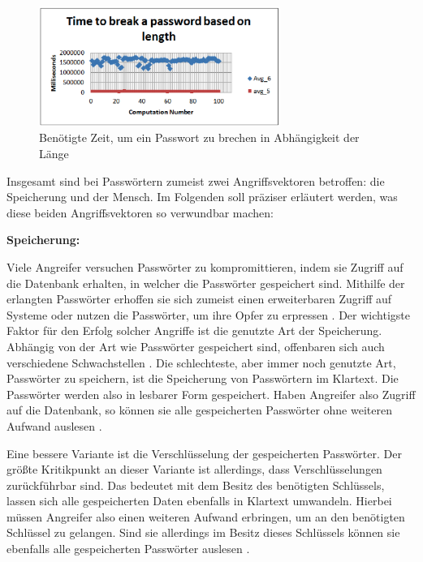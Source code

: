     \begin{figure}[H]
        \centering 
        \includegraphics[width=0.7\textwidth]{img/abbildungen/length-time.png}
        \captionsetup{format=hang}
        \caption{Benötigte Zeit, um ein Passwort zu brechen in Abhängigkeit der Länge \cite{chanda2016password}} \label{timetobreak}
    \end{figure}

    Insgesamt sind bei Passwörtern zumeist zwei Angriffsvektoren betroffen: die Speicherung und der Mensch. Im Folgenden soll präziser erläutert werden, was diese beiden Angriffsvektoren so verwundbar machen:

    \textbf{Speicherung:}

    Viele Angreifer versuchen Passwörter zu kompromittieren, indem sie Zugriff auf die Datenbank erhalten, in welcher die Passwörter gespeichert sind. Mithilfe der erlangten Passwörter erhoffen sie sich zumeist einen erweiterbaren Zugriff auf Systeme oder nutzen die Passwörter, um ihre Opfer zu erpressen \cite{boonkrong2012security}. Der wichtigste Faktor für den Erfolg solcher Angriffe ist die genutzte Art der Speicherung. Abhängig von der Art wie Passwörter gespeichert sind, offenbaren sich auch verschiedene Schwachstellen \cite{chanda2016password}.
    Die schlechteste, aber immer noch genutzte Art, Passwörter zu speichern, ist die Speicherung von Passwörtern im Klartext. Die Passwörter werden also in lesbarer Form gespeichert. Haben Angreifer also Zugriff auf die Datenbank, so können sie alle gespeicherten Passwörter ohne weiteren Aufwand auslesen \cite{chanda2016password}.

    Eine bessere Variante ist die Verschlüsselung der gespeicherten Passwörter. Der größte Kritikpunkt an dieser Variante ist allerdings, dass Verschlüsselungen zurückführbar sind. Das bedeutet mit dem Besitz des benötigten Schlüssels, lassen sich alle gespeicherten Daten ebenfalls in Klartext umwandeln. Hierbei müssen Angreifer also einen weiteren Aufwand erbringen, um an den benötigten Schlüssel zu gelangen. Sind sie allerdings im Besitz dieses Schlüssels können sie ebenfalls alle gespeicherten Passwörter auslesen \cite{chanda2016password}. 

